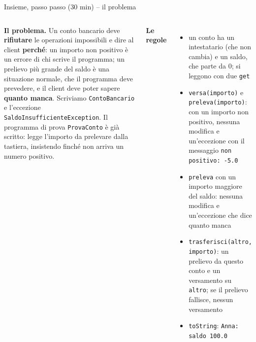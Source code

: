 \documentclass[10pt,aspectratio=169]{beamer}
\begin{document}
\begin{frame}[fragile]{Insieme, passo passo (30 min) -- il problema}
\begin{columns}[T]
\footnotesize
\textbf{Il problema.} Un conto bancario deve \textbf{rifiutare} le operazioni impossibili e dire al client \textbf{perché}: un importo non positivo è un errore di chi scrive il programma; un prelievo più grande del saldo è una situazione normale, che il programma deve prevedere, e il client deve poter sapere \textbf{quanto manca}. Scriviamo \texttt{ContoBancario} e l'eccezione \texttt{SaldoInsufficienteException}. Il programma di prova \texttt{ProvaConto} è già scritto: legge l'importo da prelevare dalla tastiera, insistendo finché non arriva un numero positivo.

\vspace{0.1cm}
\textbf{Le regole}
\begin{itemize}\itemsep=2pt
    \item un conto ha un intestatario (che non cambia) e un saldo, che parte da 0; si leggono con due \texttt{get}
    \item \texttt{versa(importo)} e \texttt{preleva(importo)}: con un importo non positivo, nessuna modifica e un'eccezione con il messaggio \texttt{non positivo: -5.0}
    \item \texttt{preleva} con un importo maggiore del saldo: nessuna modifica e un'eccezione che dice quanto manca
    \item \texttt{trasferisci(altro, importo)}: un prelievo da questo conto e un versamento su \texttt{altro}; se il prelievo fallisce, nessun versamento
    \item \texttt{toString}: \texttt{Anna: saldo 100.0}
\end{itemize}

\end{columns}
\end{frame}
\end{document}
